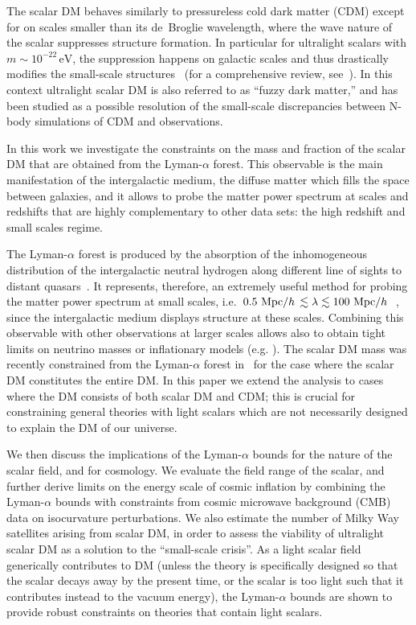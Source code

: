 \documentclass[11pt,nofootinbib]{article}
\numberwithin{equation}{section}
\begin{document}
The scalar DM behaves similarly to pressureless cold dark matter (CDM)
except for on scales smaller than its de~Broglie wavelength,
where the wave nature of the scalar suppresses structure formation.
In particular for ultralight scalars with $m \sim 10^{-22}\,
\mathrm{eV}$,
the suppression happens on galactic scales and thus drastically modifies
the small-scale structures~\cite{Hu:2000ke} (for a comprehensive review, see~\cite{Hui:2016ltb}).
In this context ultralight scalar DM is also referred to as ``fuzzy
dark matter,'' and has been studied as a possible resolution of the
small-scale discrepancies between N-body simulations of CDM and
observations. 

In this work we investigate the constraints on the mass and fraction of the
scalar DM that are obtained from the Lyman-$\alpha$ forest.  This observable is the main
manifestation of the intergalactic medium, the diffuse matter which fills the space between galaxies, and 
it allows to probe the matter power spectrum at scales and redshifts that are highly complementary to other data sets: the high redshift and small
scales regime.

The Lyman-$\alpha$ forest \cite{Mcquinn} is produced by the absorption of the inhomogeneous distribution of the intergalactic neutral hydrogen along different line of sights to distant quasars~\cite{Viel:2001hd}. It represents, therefore, an extremely useful method for probing the matter power spectrum at small scales, i.e.~$0.5~{\rm Mpc}/h\, \lesssim  \lambda \lesssim 100~{\rm Mpc}/h\, $~\cite{Viel:2013apy,Irsic:2017yje}, since the intergalactic medium displays structure at these scales.
Combining this observable with other observations at larger scales allows also to obtain tight limits on neutrino masses or inflationary models (e.g. \cite{pala,seljak06}).
The scalar DM mass was recently constrained from the Lyman-$\alpha$ forest
in~\cite{Irsic:2017yje,Armengaud:2017nkf} 
for the case where the scalar DM constitutes the entire DM.
In this paper we extend the analysis to cases where the DM consists of
both scalar DM and CDM; this is crucial for constraining general theories
with light scalars which are not necessarily designed to explain the DM
of our universe. 

We then discuss the implications of the Lyman-$\alpha$ bounds for the
nature of the scalar field, and for cosmology.
We evaluate the field range of the scalar, and further derive limits on
the energy scale of cosmic inflation by combining the Lyman-$\alpha$
bounds with constraints from cosmic microwave 
background (CMB) data on isocurvature perturbations.
We also estimate the number of Milky Way satellites arising from scalar DM,
in order to assess the viability of ultralight scalar DM as a solution to
the ``small-scale crisis''.
As a light scalar field generically contributes to DM 
(unless the theory is specifically designed so that the scalar
decays away by the present time, or the scalar is too light such that it
contributes instead to the vacuum energy),
the Lyman-$\alpha$ bounds are shown to provide robust constraints on
theories that contain light scalars.
\end{document}
